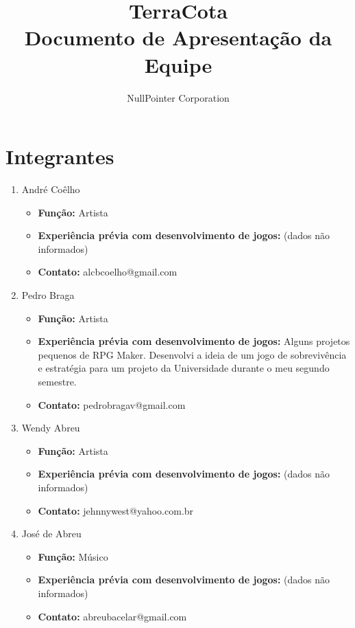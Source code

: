 \documentclass[11pt]{article}
\begin{document}
\title{TerraCota \\
Documento de Apresentação da Equipe}
\author{NullPointer Corporation}
\date{}
\maketitle


\section{Integrantes}

\begin{enumerate}

\item André Coêlho

\begin{itemize}
\item \textbf{Função:} Artista
\item \textbf{Experiência prévia com desenvolvimento de jogos:} (dados não informados)
\item \textbf{Contato:} alcbcoelho@gmail.com
\end{itemize}

\item Pedro Braga

\begin{itemize}
\item \textbf{Função:} Artista
\item \textbf{Experiência prévia com desenvolvimento de jogos:}
	Alguns projetos pequenos de RPG Maker. Desenvolvi a ideia de um jogo
	de sobrevivência e estratégia para um projeto da Universidade durante
	o meu segundo semestre.
\item \textbf{Contato:} pedrobragav@gmail.com
\end{itemize}

\item Wendy Abreu

\begin{itemize}
\item \textbf{Função:} Artista
\item \textbf{Experiência prévia com desenvolvimento de jogos:} (dados não informados)
\item \textbf{Contato:} jehnnywest@yahoo.com.br
\end{itemize}

\item José de Abreu

\begin{itemize}
\item \textbf{Função:} Músico
\item \textbf{Experiência prévia com desenvolvimento de jogos:} (dados não informados)
\item \textbf{Contato:} abreubacelar@gmail.com
\end{itemize}


\end{enumerate}
\end{document}
